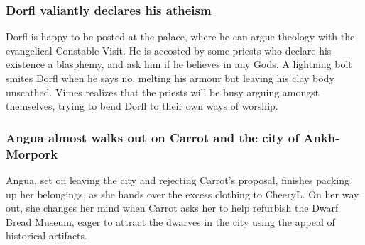 \subsubsection{\Gls{Dorfl} valiantly declares his atheism}
\Gls{Dorfl} is happy to be posted at the palace, where he can argue theology with the evangelical
Constable \Gls{Visit}. He is accosted by some priests who declare his existence a blasphemy, and
ask him if he believes in any Gods. A lightning bolt smites \Gls{Dorfl} when he says no, melting
his armour but leaving his clay body unscathed. \Gls{Vimes} realizes that the priests will be busy
arguing amongst themselves, trying to bend \Gls{Dorfl} to their own ways of worship.

\subsubsection{\Gls{Angua} almost walks out on \Gls{Carrot} and the city of Ankh-Morpork}
\Gls{Angua}, set on leaving the city and rejecting \Gls{Carrot}'s proposal, finishes packing up her
belongings, as she hands over the excess clothing to \Gls{CheeryL}. On her way out, she changes her
mind when \Gls{Carrot} asks her to help refurbish the Dwarf Bread Museum, eager to attract the
dwarves in the city using the appeal of historical artifacts.